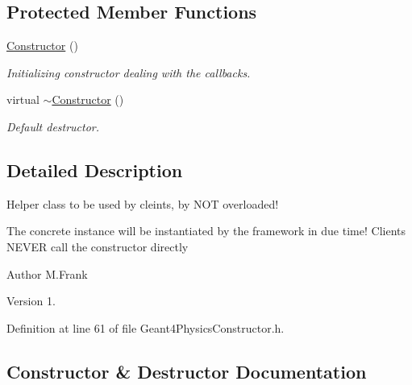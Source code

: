 \subsection*{Protected Member Functions}
\begin{DoxyCompactItemize}
\item 
\hyperlink{class_d_d4hep_1_1_simulation_1_1_geant4_physics_constructor_1_1_constructor_ad1c610b29914e3dbbd472e95ed60a07d}{Constructor} ()
\begin{DoxyCompactList}\small\item\em Initializing constructor dealing with the callbacks. \end{DoxyCompactList}\item 
virtual \hyperlink{class_d_d4hep_1_1_simulation_1_1_geant4_physics_constructor_1_1_constructor_a9b97bd3101cbf16f3ff03b382763c3a0}{$\sim$\+Constructor} ()
\begin{DoxyCompactList}\small\item\em Default destructor. \end{DoxyCompactList}\end{DoxyCompactItemize}


\subsection{Detailed Description}
Helper class to be used by cleints, by N\+OT overloaded! 

The concrete instance will be instantiated by the framework in due time! Clients N\+E\+V\+ER call the constructor directly

\begin{DoxyAuthor}{Author}
M.\+Frank 
\end{DoxyAuthor}
\begin{DoxyVersion}{Version}
1. 
\end{DoxyVersion}


Definition at line 61 of file Geant4\+Physics\+Constructor.\+h.



\subsection{Constructor \& Destructor Documentation}
\hypertarget{class_d_d4hep_1_1_simulation_1_1_geant4_physics_constructor_1_1_constructor_ad1c610b29914e3dbbd472e95ed60a07d}{}\label{class_d_d4hep_1_1_simulation_1_1_geant4_physics_constructor_1_1_constructor_ad1c610b29914e3dbbd472e95ed60a07d} 
